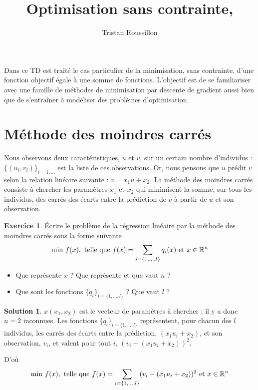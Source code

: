 \documentclass[a4paper,francais]{article}
\title{Optimisation sans contrainte, }
\author{Tristan Roussillon}
\newcommand{\R}{{\ensuremath\mathbb{R}}}
\theoremstyle{definition}
\newtheorem{exercice}{Exercice}[section]
\newtheorem*{solution}{Solution}
\begin{document}
\maketitle

Dans ce TD est traité le cas particulier de la minimisation, sans contrainte,
d'une fonction objectif égale à une somme de fonctions. L'objectif est de se
familiariser avec une famille de méthodes de minimisation par descente de
gradient aussi bien que de s'entraîner à modéliser des problèmes d'optimisation.

\section{Méthode des moindres carrés}

Nous observons deux caractéristiques, $u$ et $v$, sur un certain nombre d'individus :
$\{(u_i,v_i)\}_{i = 1,\dots}$ est la liste de ces observations.
Or, nous pensons que $u$ prédit $v$ selon la relation linéaire suivante :
$v = x_1u + x_2$. La méthode des moindres carrés
consiste à chercher les paramètres $x_1$ et $x_2$ qui minimisent
la somme, sur tous les individus, des carrés des écarts entre la prédiction
de $v$ à partir de $u$ et son observation. 

\begin{exercice}
  \'Ecrire le problème de la régression linéaire par la méthode des moindres carrés
  sous la forme suivante
  \[
  \text{min} \ f(x), \ \text{telle que} \
  f(x) = \sum_{i = \{1,\dots,l\}} q_i(x) \ \text{et} \ x \in \R^n
  \]

  \begin{itemize}
  \item Que représente $x$ ? Que représente et que vaut $n$ ?
  \item Que sont les fonctions $\{q_i\}_{i = \{1,\dots,l\}}$ ? Que vaut $l$ ?
  \end{itemize}
\end{exercice}

\begin{solution}
  $x(x_1,x_2)$ est le vecteur de paramètres à chercher ; il y a donc $n=2$ inconnues.
  Les fonctions $\{q_i\}_{i = \{1,\dots,l\}}$ représentent, pour chacun des $l$ individus, les carrés des
  écarts entre la prédiction, $(x_1u_i + x_2)$, et son observation, $v_i$, et valent pour tout $i$,
  $(v_i - (x_1u_i + x_2))^2$.

  D'où
  \[
  \text{min} \ f(x), \ \text{telle que} \
  f(x) = \sum_{i = \{1,\dots,l\}} (v_i - (x_1u_i + x_2))^2 \ \text{et} \ x \in \R^n
  \]
\end{solution}
\end{document}
